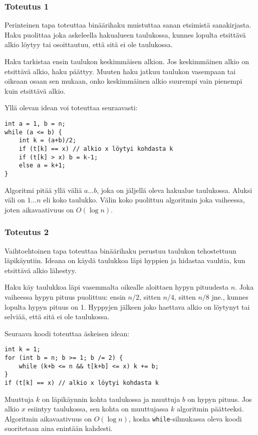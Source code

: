 \subsubsection{Toteutus 1}

Perinteinen tapa toteuttaa binäärihaku muistuttaa sanan etsimistä
sanakirjasta. Haku puolittaa joka askeleella hakualueen taulukossa,
kunnes lopulta etsittävä alkio löytyy tai osoittautuu,
että sitä ei ole taulukossa.

Haku tarkistaa ensin taulukon keskimmäisen alkion.
Jos keskimmäinen alkio on etsittävä alkio, haku päättyy.
Muuten haku jatkuu taulukon vasempaan tai oikeaan osaan sen mukaan,
onko keskimmäinen alkio suurempi vain pienempi kuin etsittävä alkio.

Yllä olevan idean voi toteuttaa seuraavasti:
\begin{lstlisting}
int a = 1, b = n;
while (a <= b) {
    int k = (a+b)/2;
    if (t[k] == x) // alkio x löytyi kohdasta k
    if (t[k] > x) b = k-1;
    else a = k+1;
}
\end{lstlisting}

Algoritmi pitää yllä väliä $a \ldots b$, joka on
jäljellä oleva hakualue taulukossa.
Aluksi väli on $1 \ldots n$ eli koko taulukko.
Välin koko puolittuu algoritmin joka vaiheessa,
joten aikavaativuus on $O(\log n)$.

\subsubsection{Toteutus 2}

Vaihtoehtoinen tapa toteuttaa binäärihaku
perustuu taulukon tehostettuun läpikäyntiin.
Ideana on käydä taulukkoa läpi hyppien
ja hidastaa vauhtia, kun etsittävä alkio lähestyy.

Haku käy taulukkoa läpi vasemmalta oikealle aloittaen
hypyn pituudesta $n$.
Joka vaiheessa hypyn pituus puolittuu:
ensin $n/2$, sitten $n/4$, sitten $n/8$ jne.,
kunnes lopulta hypyn pituus on 1.
Hyppyjen jälkeen joko haettava alkio on löytynyt
tai selviää, että sitä ei ole taulukossa.

Seuraava koodi toteuttaa äskeisen idean:
\begin{lstlisting}
int k = 1;
for (int b = n; b >= 1; b /= 2) {
    while (k+b <= n && t[k+b] <= x) k += b;
}
if (t[k] == x) // alkio x löytyi kohdasta k
\end{lstlisting}

Muuttuja $k$ on läpikäynnin kohta taulukossa
ja muuttuja $b$ on hypyn pituus.
Jos alkio $x$ esiintyy taulukossa,
sen kohta on muuttujassa $k$ algoritmin päätteeksi.
Algoritmin aikavaativuus on $O(\log n)$,
koska \texttt{while}-silmukassa oleva koodi suoritetaan
aina enintään kahdesti.

